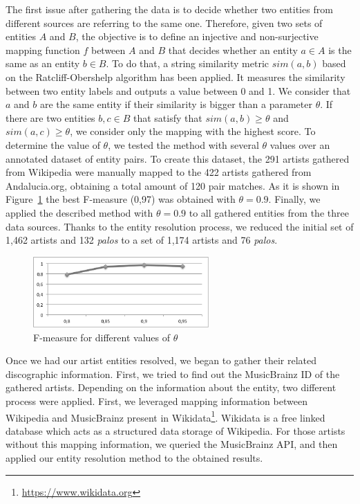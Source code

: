 The first issue after gathering the data is to decide whether two entities from different sources are referring to the same one. Therefore, given two sets of entities $A$ and $B$, the objective is to define an injective and non-surjective mapping function $f$ between $A$ and $B$ that decides whether an entity $a \in A$ is the same as an entity $b \in B$. To do that, a string similarity metric $sim(a,b)$ based on the Ratcliff-Obershelp algorithm \citep{Ratcliff1988} has been applied. It measures the similarity between two entity labels and outputs a value between 0 and 1. We consider that $a$ and $b$ are the same entity if their similarity is bigger than a parameter $\theta$. If there are two entities $b, c \in B$ that satisfy that $sim(a,b) \geq \theta$ and $sim(a,c) \geq \theta$, we consider only the mapping with the highest score. To determine the value of $\theta$, we tested the method with several $\theta$ values over an annotated dataset of entity pairs. To create this dataset, the 291 artists gathered from Wikipedia were manually mapped to the 422 artists gathered from Andalucia.org, obtaining a total amount of 120 pair matches. As it is shown in Figure~\ref{fig:musicology:fmeasure} the best F-measure (0,97) was obtained with $\theta=0.9$. Finally, we applied the described method with $\theta=0.9$ to all gathered entities from the three data sources. Thanks to the entity resolution process, we reduced the initial set of 1,462 artists and 132 \textit{palos} to a set of 1,174 artists and 76 \textit{palos}.

\begin{figure}
	\centering
	\includegraphics[width=0.60\textwidth]{ch05_musicology_pics/similarity_f_bn.png}
	\caption{F-measure for different values of $\theta$ \label{fig:musicology:fmeasure}}
\end{figure}

Once we had our artist entities resolved, we began to gather their related discographic information. First, we tried to find out the MusicBrainz ID of the gathered artists. Depending on the information about the entity, two different process were applied. First, we leveraged mapping information between Wikipedia and MusicBrainz present in Wikidata\footnote{\url{https://www.wikidata.org}}. Wikidata is a free linked database which acts as a structured data storage of Wikipedia. %
For those artists without this mapping information, we queried the MusicBrainz API, and then applied our entity resolution method to the obtained results.

